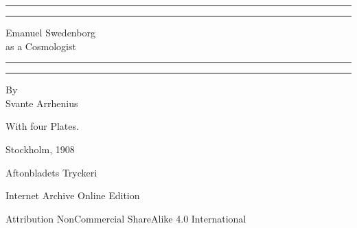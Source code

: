 \documentclass[a4paper, 11pt, oneside, polutonikogreek, english]{article}
\begin{document}
\begin{titlepage} %
	\centering %
	\scshape %

	
	\rule{\textwidth}{1.6pt}\vspace*{-\baselineskip}\vspace*{2pt} %
	\rule{\textwidth}{0.4pt} %
	
	\vspace{0.75\baselineskip} %

        {\LARGE Emanuel Swedenborg \\as a Cosmologist \\} %
	
	\vspace{0.75\baselineskip} %
	
	\rule{\textwidth}{0.4pt}\vspace*{-\baselineskip}\vspace{3.2pt} %
	\rule{\textwidth}{1.6pt} %
	
	\vspace{1\baselineskip} %
	
	
	{By \\\Large Svante Arrhenius\\} %
	
	\vspace*{1\baselineskip} %
	

        {\small With four Plates.}
 
	
	
		
	\vspace*{\fill}%
	
	
	{Stockholm, 1908} %
 
        {\small Aftonbladets Tryckeri}

	\vspace{1\baselineskip} %

        Internet Archive Online Edition  %
	
	{\small Attribution NonCommercial ShareAlike 4.0 International } %
\end{titlepage}
\end{document}
